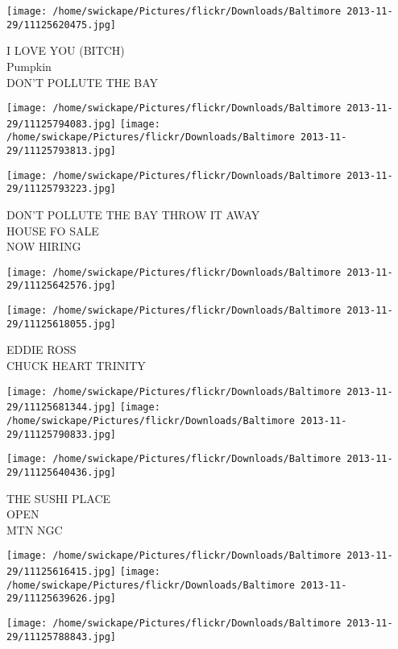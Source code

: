 \documentclass[10pt,letterpaper]{article}
\begin{document}
\vspace{0.25in}
\texttt{[image: /home/swickape/Pictures/flickr/Downloads/Baltimore 2013-11-29/11125620475.jpg]}

I LOVE YOU (BITCH)\\
Pumpkin\\
DON'T POLLUTE THE BAY
\pagebreak

\texttt{[image: /home/swickape/Pictures/flickr/Downloads/Baltimore 2013-11-29/11125794083.jpg]}
\texttt{[image: /home/swickape/Pictures/flickr/Downloads/Baltimore 2013-11-29/11125793813.jpg]}

\texttt{[image: /home/swickape/Pictures/flickr/Downloads/Baltimore 2013-11-29/11125793223.jpg]}

DON'T POLLUTE THE BAY THROW IT AWAY\\
HOUSE FO SALE\\
NOW HIRING
\pagebreak

\texttt{[image: /home/swickape/Pictures/flickr/Downloads/Baltimore 2013-11-29/11125642576.jpg]}

\vspace{0.25in}
\texttt{[image: /home/swickape/Pictures/flickr/Downloads/Baltimore 2013-11-29/11125618055.jpg]}

EDDIE ROSS\\
CHUCK HEART TRINITY
\pagebreak

\texttt{[image: /home/swickape/Pictures/flickr/Downloads/Baltimore 2013-11-29/11125681344.jpg]}
\texttt{[image: /home/swickape/Pictures/flickr/Downloads/Baltimore 2013-11-29/11125790833.jpg]}

\vspace{0.25in}
\texttt{[image: /home/swickape/Pictures/flickr/Downloads/Baltimore 2013-11-29/11125640436.jpg]}

THE SUSHI PLACE\\
OPEN\\
MTN NGC
\pagebreak

\texttt{[image: /home/swickape/Pictures/flickr/Downloads/Baltimore 2013-11-29/11125616415.jpg]}
\texttt{[image: /home/swickape/Pictures/flickr/Downloads/Baltimore 2013-11-29/11125639626.jpg]}

\vspace{0.25in}
\texttt{[image: /home/swickape/Pictures/flickr/Downloads/Baltimore 2013-11-29/11125788843.jpg]}
\end{document}
